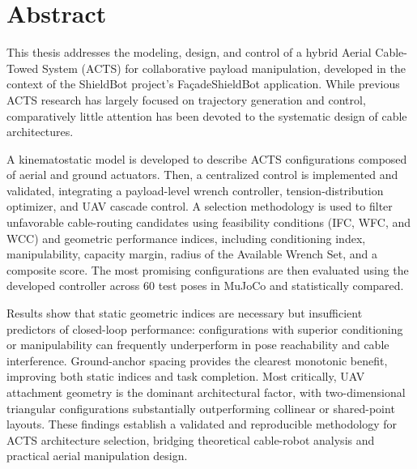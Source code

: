 \section*{Abstract}
This thesis addresses the modeling, design, and control of a hybrid Aerial Cable-Towed System (ACTS) for collaborative payload manipulation, developed in the context of the ShieldBot project's FaçadeShieldBot application. While previous ACTS research has largely focused on trajectory generation and control, comparatively little attention has been devoted to the systematic design of cable architectures.

A kinematostatic model is developed to describe ACTS configurations composed of aerial and ground actuators. Then, a centralized control is implemented and validated, integrating a payload-level wrench controller, tension-distribution optimizer, and UAV cascade control. A selection methodology is used to filter unfavorable cable-routing candidates using feasibility conditions (IFC, WFC, and WCC) and geometric performance indices, including conditioning index, manipulability, capacity margin, radius of the Available Wrench Set, and a composite score. The most promising configurations are then evaluated using the developed controller across 60 test poses in MuJoCo and statistically compared.

Results show that static geometric indices are necessary but insufficient predictors of closed-loop performance: configurations with superior conditioning or manipulability can frequently underperform in pose reachability and cable interference. Ground-anchor spacing provides the clearest monotonic benefit, improving both static indices and task completion. Most critically, UAV attachment geometry is the dominant architectural factor, with two-dimensional triangular configurations substantially outperforming collinear or shared-point layouts. These findings establish a validated and reproducible methodology for ACTS architecture selection, bridging theoretical cable-robot analysis and practical aerial manipulation design.



\newpage